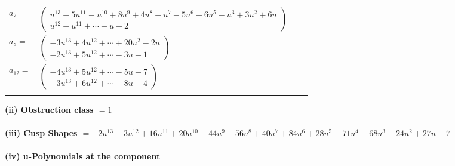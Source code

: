 \documentclass[1p]{elsarticle_modified}
\theoremstyle{definition}
\begin{document}
\begin{tabular}{m{7pt} m{180pt} m{7pt} m{180pt} }
\flushright $a_{7}=$&$\begin{pmatrix}u^{13}-5 u^{11}- u^{10}+8 u^9+4 u^8- u^7-5 u^6-6 u^5- u^3+3 u^2+6 u\\u^{12}+u^{11}+\cdots+u-2\end{pmatrix}$ \\
\flushright $a_{8}=$&$\begin{pmatrix}-3 u^{13}+4 u^{12}+\cdots+20 u^2-2 u\\-2 u^{13}+5 u^{12}+\cdots-3 u-1\end{pmatrix}$ \\
\flushright $a_{12}=$&$\begin{pmatrix}-4 u^{13}+5 u^{12}+\cdots-5 u-7\\-3 u^{13}+6 u^{12}+\cdots-8 u-4\end{pmatrix}$\\&\end{tabular}
\flushleft \textbf{(ii) Obstruction class $= 1$}\\~\\
\flushleft \textbf{(iii) Cusp Shapes $= -2 u^{13}-3 u^{12}+16 u^{11}+20 u^{10}-44 u^9-56 u^8+40 u^7+84 u^6+28 u^5-71 u^4-68 u^3+24 u^2+27 u+7$}\\~\\
\newpage\renewcommand{\arraystretch}{1}
\flushleft \textbf{(iv) u-Polynomials at the component}\newline \\
\end{document}
